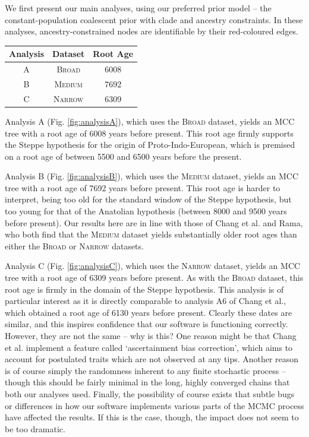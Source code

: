 \documentclass[10pt,journal,compsoc]{IEEEtran}
\begin{document}
We first present our main analyses, using our preferred prior model -- the constant-population coalescent prior with clade and ancestry constraints. In these analyses, ancestry-constrained nodes are identifiable by their red-coloured edges.

\begin{center}
    \begin{tabular}{ |c|c|c| }
    \hline
    Analysis&Dataset&Root Age\\
    \hline
    A&\textsc{Broad}&6008\\
    B&\textsc{Medium}&7692\\
    C&\textsc{Narrow}&6309\\
    \hline
    \end{tabular}
\end{center}

Analysis A (Fig. \ref{fig:analysisA}), which uses the \textsc{Broad} dataset, yields an MCC tree with a root age of 6008 years before present. This root age firmly supports the Steppe hypothesis for the origin of Proto-Indo-European, which is premised on a root age of between 5500 and 6500 years before the present.

Analysis B (Fig. \ref{fig:analysisB}), which uses the \textsc{Medium} dataset, yields an MCC tree with a root age of 7692 years before present. This root age is harder to interpret, being too old for the standard window of the Steppe hypothesis, but too young for that of the Anatolian hypothesis (between 8000 and 9500 years before present). Our results here are in line with those of Chang et al. and Rama, who both find that the \textsc{Medium} dataset yields substantially older root ages than either the \textsc{Broad} or \textsc{Narrow} datasets.

Analysis C (Fig. \ref{fig:analysisC}), which uses the \textsc{Narrow} dataset, yields an MCC tree with a root age of 6309 years before present. As with the \textsc{Broad} dataset, this root age is firmly in the domain of the Steppe hypothesis. This analysis is of particular interest as it is directly comparable to analysis A6 of Chang et al., which obtained a root age of 6130 years before present. Clearly these dates are similar, and this inspires confidence that our software is functioning correctly. However, they are not the same -- why is this? One reason might be that Chang et al. implement a feature called `ascertainment bias correction', which aims to account for postulated traits which are not observed at any tips. Another reason is of course simply the randomness inherent to any finite stochastic process -- though this should be fairly minimal in the long, highly converged chains that both our analyses used. Finally, the possibility of course exists that subtle bugs or differences in how our software implements various parts of the MCMC process have affected the results. If this is the case, though, the impact does not seem to be too dramatic.
\end{document}
